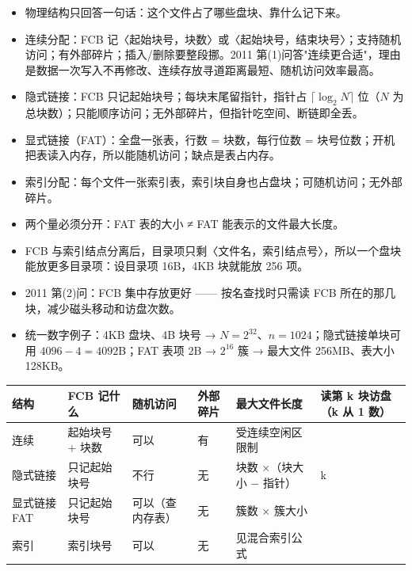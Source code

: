 \documentclass[10pt,a4paper]{ctexart}
\begin{document}
\begin{itemize}

\item 物理结构只回答一句话：这个文件占了哪些盘块、靠什么记下来。

\item 连续分配：FCB 记〈起始块号，块数〉或〈起始块号，结束块号〉；支持随机访问；有外部碎片；插入/删除要整段挪。2011 第(1)问答"连续更合适"，理由是数据一次写入不再修改、连续存放寻道距离最短、随机访问效率最高。

\item 隐式链接：FCB 只记起始块号；每块末尾留指针，指针占 $\lceil \log_2 N \rceil$ 位（$N$ 为总块数）；只能顺序访问；无外部碎片，但指针吃空间、断链即全丢。

\item 显式链接（FAT）：全盘一张表，行数 = 块数，每行位数 = 块号位数；开机把表读入内存，所以能随机访问；缺点是表占内存。

\item 索引分配：每个文件一张索引表，索引块自身也占盘块；可随机访问；无外部碎片。

\item 两个量必须分开：FAT 表的大小 ≠ FAT 能表示的文件最大长度。

\item FCB 与索引结点分离后，目录项只剩〈文件名，索引结点号〉，所以一个盘块能放更多目录项：设目录项 16B，4KB 块就能放 256 项。

\item 2011 第(2)问：FCB 集中存放更好 —— 按名查找时只需读 FCB 所在的那几块，减少磁头移动和访盘次数。

\item 统一数字例子：4KB 盘块、4B 块号 → $N=2^{32}$、$n=1024$；隐式链接单块可用 $4096-4=4092$B；FAT 表项 2B → $2^{16}$ 簇 → 最大文件 256MB、表大小 128KB。

\end{itemize}

\begin{center}\small
\begin{tabularx}{\linewidth}{@{}llll>{\raggedright\arraybackslash}X>{\raggedright\arraybackslash}X@{}}
\toprule
结构 & FCB 记什么 & 随机访问 & 外部碎片 & 最大文件长度 & 读第 k 块访盘（k 从 1 数） \\
\midrule
连续 & 起始块号 + 块数 & 可以 & 有 & 受连续空闲区限制 & 1 \\
隐式链接 & 只记起始块号 & 不行 & 无 & 块数 ×（块大小 − 指针） & k \\
显式链接 FAT & 只记起始块号 & 可以（查内存表） & 无 & 簇数 × 簇大小 & 1 \\
索引 & 索引块号 & 可以 & 无 & 见混合索引公式 & 2 \\
\bottomrule
\end{tabularx}
\end{center}
\end{document}
